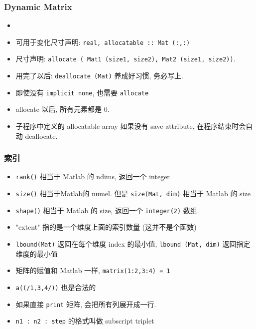 \subsubsection{Dynamic Matrix}
\begin{itemize}
\item \item 可用于变化尺寸声明: \verb`real, allocatable :: Mat (:,:)`
\item 尺寸声明: \verb`allocate ( Mat1 (size1, size2), Mat2 (size1, size2))`.
\item 用完了以后: \verb`deallocate (Mat)` 养成好习惯, 务必写上.
\item 即使没有 \verb`implicit none`, 也需要 \verb`allocate`
\item allocate 以后, 所有元素都是 0.
\item 子程序中定义的 allocatable array 如果没有 save attribute, 在程序结束时会自动 deallocate.
\end{itemize}

\subsubsection{索引}
\begin{itemize}
\item \verb`rank()` 相当于 Matlab 的 ndims, 返回一个 integer
\item \verb`size()` 相当于Matlab的 numel. 但是 \verb`size(Mat, dim)` 相当于 Matlab 的 size
\item \verb`shape()` 相当于 Matlab 的 size, 返回一个 \verb`integer(2)` 数组.
\item "extent" 指的是一个维度上面的索引数量 (这并不是个函数)
\item \verb`lbound(Mat)` 返回在每个维度 index 的最小值, \verb`lbound (Mat, dim)` 返回指定维度的最小值
\item 矩阵的赋值和 Matlab 一样, \verb`matrix(1:2,3:4) = 1`
\item \verb`a((/1,3,4/))` 也是合法的
\item 如果直接 \verb`print` 矩阵, 会把所有列展开成一行.
\item \verb`n1 : n2 : step` 的格式叫做 subscript triplet
\end{itemize}

